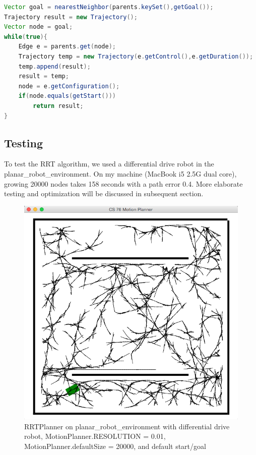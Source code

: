 \documentclass[9.5pt]{extarticle}
\begin{document}
\begin{lstlisting}[language=java,caption={Java code for findPath}]
Vector goal = nearestNeighbor(parents.keySet(),getGoal());
Trajectory result = new Trajectory();
Vector node = goal;
while(true){
	Edge e = parents.get(node);
	Trajectory temp = new Trajectory(e.getControl(),e.getDuration());
	temp.append(result);
	result = temp;
	node = e.getConfiguration();
	if(node.equals(getStart()))
		return result;
}
\end{lstlisting}

\subsection{Testing}

To test the RRT algorithm, we used a differential drive robot in the planar\_robot\_environment. On my machine (MacBook i5 2.5G dual core), growing 20000 nodes takes 158 seconds with a path error 0.4. More elaborate testing and optimization will be discussed in subsequent section.

\begin{figure}[H]
\centering
\includegraphics[scale=0.4]{rrt1.png}
\caption{RRTPlanner on planar\_robot\_environment with differential drive robot, MotionPlanner.RESOLUTION = 0.01, MotionPlanner.defaultSize = 20000, and default start/goal}
\label{Figure 2}
\end{figure}
\end{document}
